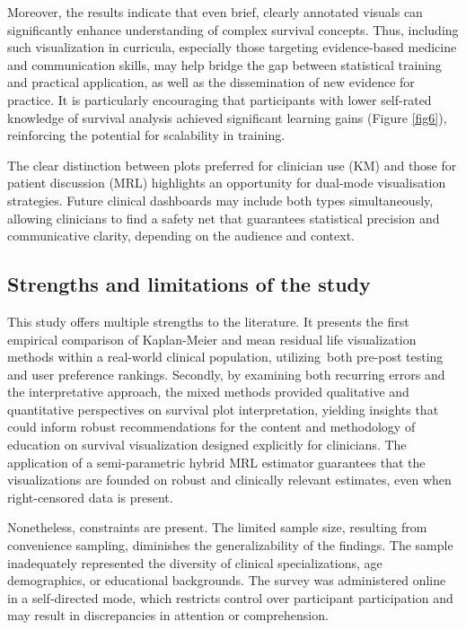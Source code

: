 \documentclass[
  onecolumn]{article}
\begin{document}
Moreover, the results indicate that even brief, clearly annotated
visuals can significantly enhance understanding of complex survival
concepts. Thus, including such visualization in curricula, especially
those targeting evidence-based medicine and communication skills, may
help bridge the gap between statistical training and practical
application, as well as the dissemination of new evidence for practice.
It is particularly encouraging that participants with lower self-rated
knowledge of survival analysis achieved significant learning gains
(Figure \ref{fig6}), reinforcing the potential for scalability in
training.

The clear distinction between plots preferred for clinician use (KM) and
those for patient discussion (MRL) highlights an opportunity for
dual-mode visualisation strategies. Future clinical dashboards may
include both types simultaneously, allowing clinicians to find a safety
net that guarantees statistical precision and communicative clarity,
depending on the audience and context.

\subsection{Strengths and limitations of the
study}\label{strengths-and-limitations-of-the-study}

This study offers multiple strengths to the literature. It presents the
first empirical comparison of Kaplan-Meier and mean residual life
visualization methods within a real-world clinical population,
utilizing~both pre-post testing and user preference rankings. Secondly,
by examining both recurring errors and the interpretative approach, the
mixed methods provided qualitative and quantitative perspectives on
survival plot interpretation, yielding insights that could inform robust
recommendations for the content and methodology of education on survival
visualization designed explicitly for clinicians. The application of a
semi-parametric hybrid MRL estimator guarantees that the visualizations
are founded on robust and clinically relevant estimates, even when
right-censored data is present.

Nonetheless, constraints are present. The limited sample size, resulting
from convenience sampling, diminishes the generalizability of the
findings. The sample inadequately represented the diversity of clinical
specializations, age demographics, or educational backgrounds. The
survey was administered online in a self-directed mode, which restricts
control over participant participation and may result in discrepancies
in attention or comprehension.
\end{document}
